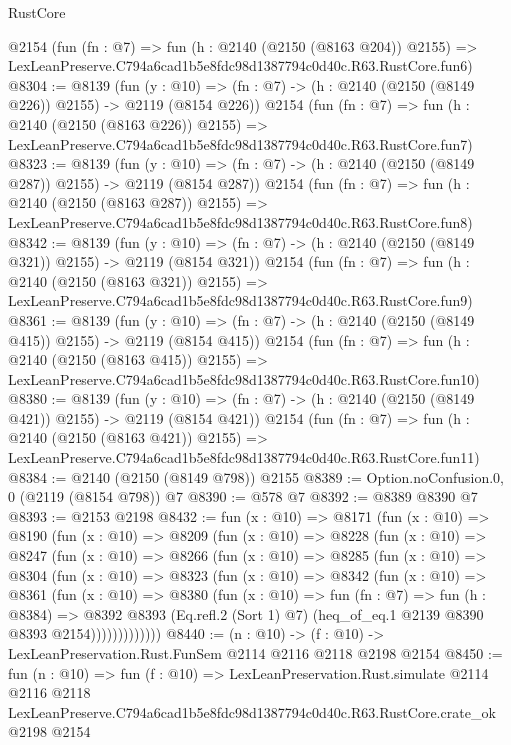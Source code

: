 \begin{lexlean}{RustCore}
\begin{coremodule}
    @2154
    (fun (fn : @7) =>
    fun (h : @2140 (@2150 (@8163 @204)) @2155) =>
    LexLeanPreserve.C794a6cad1b5e8fdc98d1387794c0d40c.R63.RustCore.fun6)
@8304 := @8139
    (fun (y : @10) => (fn : @7) -> (h : @2140 (@2150 (@8149 @226)) @2155) -> @2119 (@8154 @226))
    @2154
    (fun (fn : @7) =>
    fun (h : @2140 (@2150 (@8163 @226)) @2155) =>
    LexLeanPreserve.C794a6cad1b5e8fdc98d1387794c0d40c.R63.RustCore.fun7)
@8323 := @8139
    (fun (y : @10) => (fn : @7) -> (h : @2140 (@2150 (@8149 @287)) @2155) -> @2119 (@8154 @287))
    @2154
    (fun (fn : @7) =>
    fun (h : @2140 (@2150 (@8163 @287)) @2155) =>
    LexLeanPreserve.C794a6cad1b5e8fdc98d1387794c0d40c.R63.RustCore.fun8)
@8342 := @8139
    (fun (y : @10) => (fn : @7) -> (h : @2140 (@2150 (@8149 @321)) @2155) -> @2119 (@8154 @321))
    @2154
    (fun (fn : @7) =>
    fun (h : @2140 (@2150 (@8163 @321)) @2155) =>
    LexLeanPreserve.C794a6cad1b5e8fdc98d1387794c0d40c.R63.RustCore.fun9)
@8361 := @8139
    (fun (y : @10) => (fn : @7) -> (h : @2140 (@2150 (@8149 @415)) @2155) -> @2119 (@8154 @415))
    @2154
    (fun (fn : @7) =>
    fun (h : @2140 (@2150 (@8163 @415)) @2155) =>
    LexLeanPreserve.C794a6cad1b5e8fdc98d1387794c0d40c.R63.RustCore.fun10)
@8380 := @8139
    (fun (y : @10) => (fn : @7) -> (h : @2140 (@2150 (@8149 @421)) @2155) -> @2119 (@8154 @421))
    @2154
    (fun (fn : @7) =>
    fun (h : @2140 (@2150 (@8163 @421)) @2155) =>
    LexLeanPreserve.C794a6cad1b5e8fdc98d1387794c0d40c.R63.RustCore.fun11)
@8384 := @2140 (@2150 (@8149 @798)) @2155
@8389 := Option.noConfusion.{0, 0} (@2119 (@8154 @798)) @7
@8390 := @578 @7
@8392 := @8389 @8390 @7
@8393 := @2153 @2198
@8432 := fun (x : @10) =>
  @8171
    (fun (x : @10) =>
    @8190
      (fun (x : @10) =>
      @8209
        (fun (x : @10) =>
        @8228
          (fun (x : @10) =>
          @8247
            (fun (x : @10) =>
            @8266
              (fun (x : @10) =>
              @8285
                (fun (x : @10) =>
                @8304
                  (fun (x : @10) =>
                  @8323
                    (fun (x : @10) =>
                    @8342
                      (fun (x : @10) =>
                      @8361
                        (fun (x : @10) =>
                        @8380
                          (fun (x : @10) =>
                          fun (fn : @7) =>
                          fun (h : @8384) =>
                          @8392
                            @8393
                            (Eq.refl.{2} (Sort 1) @7)
                            (heq_of_eq.{1} @2139 @8390 @8393 @2154)))))))))))))
@8440 := (n : @10) -> (f : @10) -> LexLeanPreservation.Rust.FunSem @2114 @2116 @2118 @2198 @2154
@8450 := fun (n : @10) =>
  fun (f : @10) =>
  LexLeanPreservation.Rust.simulate
    @2114
    @2116
    @2118
    LexLeanPreserve.C794a6cad1b5e8fdc98d1387794c0d40c.R63.RustCore.crate_ok
    @2198
    @2154
\end{coremodule}
\end{lexlean}
